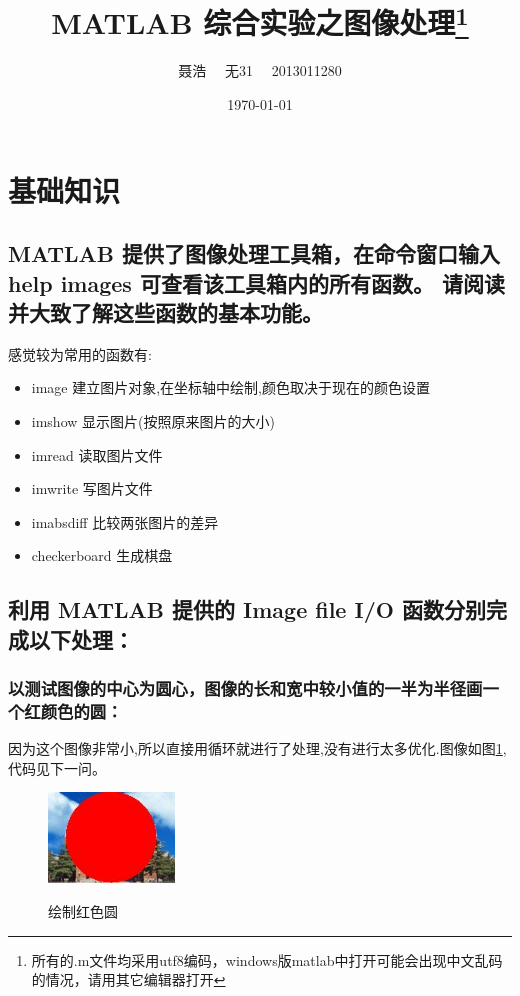 \documentclass{ctexart}
\title{MATLAB 综合实验之图像处理\footnote{所有的.m文件均采用utf8编码，windows版matlab中打开可能会出现中文乱码的情况，请用其它编辑器打开}}
\author{聂浩~~ 无31~~ 2013011280}
\date{\today}
\begin{document}
\maketitle
\section{基础知识}
\subsection{
MATLAB 提供了图像处理工具箱，在命令窗口输入 help images 可查看该工具箱内的所有函数。 请阅读并大致了解这些函数的基本功能。}

感觉较为常用的函数有:
\begin{itemize}
    \item{image 建立图片对象,在坐标轴中绘制,颜色取决于现在的颜色设置}
    \item{imshow 显示图片(按照原来图片的大小)}
    \item{imread 读取图片文件}
    \item{imwrite 写图片文件}
    \item{imabsdiff 比较两张图片的差异}
    \item{checkerboard 生成棋盘}
\end{itemize}

\subsection{
利用 MATLAB 提供的 Image file I/O 函数分别完成以下处理：}
\subsubsection{以测试图像的中心为圆心，图像的长和宽中较小值的一半为半径画一个红颜色的圆：}
因为这个图像非常小,所以直接用循环就进行了处理,没有进行太多优化.图像如图\ref{1circle},代码见下一问。
\begin{figure}
    \centering
    \includegraphics[width=0.3\textwidth]{pic/circle.jpg}\\
    \caption{绘制红色圆\label{1circle}}
\end{figure}
\end{document}
